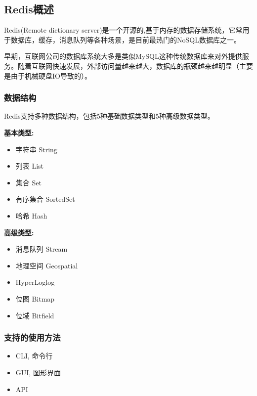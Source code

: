 
\begin{issues}
\issueDraft
\issueTODO
\end{issues}

\subsection{Redis概述}

Redis(Remote dictionary server)是一个开源的,基于内存的数据存储系统，它常用于数据库，缓存，消息队列等各种场景，是目前最热门的NoSQL数据库之一。

早期，互联网公司的数据库系统大多是类似MySQL这种传统数据库来对外提供服务。随着互联网快速发展，外部访问量越来越大，数据库的瓶颈越来越明显（主要是由于机械硬盘IO导致的）。

\subsubsection{数据结构 }
Redis支持多种数据结构，包括5种基础数据类型和5种高级数据类型。

\textbf{基本类型:}

\begin{itemize}
\item 字符串 String
\item 列表 List
\item 集合 Set
\item 有序集合 SortedSet
\item 哈希 Hash
\end{itemize}

\textbf{高级类型:}

\begin{itemize}
\item 消息队列 Stream
\item 地理空间 Geospatial
\item HyperLoglog
\item 位图 Bitmap
\item 位域 Bitfield
\end{itemize}

\subsubsection{支持的使用方法}
\begin{itemize}
\item CLI, 命令行
\item GUI, 图形界面
\item API
\end{itemize}

